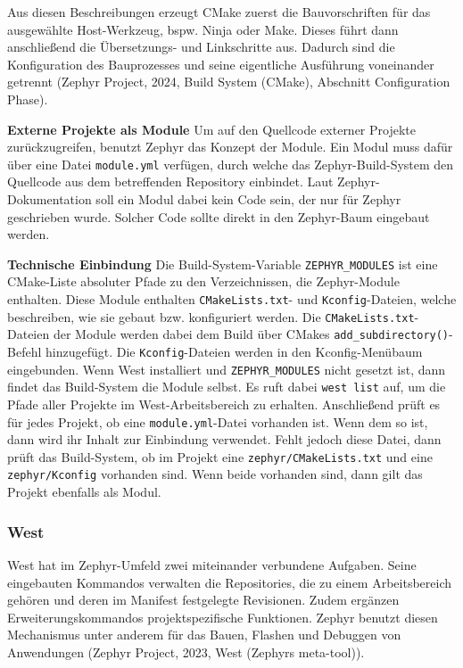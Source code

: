 Aus diesen Beschreibungen erzeugt CMake zuerst die Bauvorschriften f{\"u}r das ausgew{\"a}hlte Host-Werkzeug, bspw. Ninja oder Make. Dieses f{\"u}hrt dann anschlie{\ss}end die {\"U}bersetzungs- und Linkschritte aus. Dadurch sind die Konfiguration des Bauprozesses und seine eigentliche Ausf{\"u}hrung voneinander getrennt (Zephyr Project, 2024, \glqq{}Build System (CMake)\grqq{}, Abschnitt \glqq{}Configuration Phase\grqq{}).

\textbf{Externe Projekte als Module} Um auf den Quellcode externer Projekte zur{\"u}ckzugreifen, benutzt Zephyr das Konzept der \glqq{}Module\grqq{}. Ein Modul muss daf{\"u}r {\"u}ber eine Datei \lstinline[style=codeinline]|module.yml| verf{\"u}gen, durch welche das Zephyr-Build-System den Quellcode aus dem betreffenden Repository einbindet. Laut Zephyr-Dokumentation soll ein Modul dabei kein Code sein, der nur f{\"u}r Zephyr geschrieben wurde. Solcher Code sollte direkt in den Zephyr-Baum eingebaut werden.

\textbf{Technische Einbindung} Die Build-System-Variable \lstinline[style=codeinline]|ZEPHYR_MODULES| ist eine CMake-Liste absoluter Pfade zu den Verzeichnissen, die Zephyr-Module enthalten. Diese Module enthalten \lstinline[style=codeinline]|CMakeLists.txt|- und \lstinline[style=codeinline]|Kconfig|-Dateien, welche beschreiben, wie sie gebaut bzw. konfiguriert werden. Die \lstinline[style=codeinline]|CMakeLists.txt|-Dateien der Module werden dabei dem Build {\"u}ber CMakes \lstinline[style=codeinline]|add_subdirectory()|-Befehl hinzugef{\"u}gt. Die \lstinline[style=codeinline]|Kconfig|-Dateien werden in den Kconfig-Men{\"u}baum eingebunden. Wenn West installiert und \lstinline[style=codeinline]|ZEPHYR_MODULES| nicht gesetzt ist, dann findet das Build-System die Module selbst. Es ruft dabei \lstinline[style=codeinline]|west list| auf, um die Pfade aller Projekte im West-Arbeitsbereich zu erhalten. Anschlie{\ss}end pr{\"u}ft es f{\"u}r jedes Projekt, ob eine \lstinline[style=codeinline]|module.yml|-Datei vorhanden ist. Wenn dem so ist, dann wird ihr Inhalt zur Einbindung verwendet. Fehlt jedoch diese Datei, dann pr{\"u}ft das Build-System, ob im Projekt eine \lstinline[style=codeinline]|zephyr/CMakeLists.txt| und eine \lstinline[style=codeinline]|zephyr/Kconfig| vorhanden sind. Wenn beide vorhanden sind, dann gilt das Projekt ebenfalls als Modul.

\subsubsection{West}
West hat im Zephyr-Umfeld zwei miteinander verbundene Aufgaben. Seine eingebauten Kommandos verwalten die Repositories, die zu einem Arbeitsbereich geh{\"o}ren und deren im Manifest festgelegte Revisionen. Zudem erg{\"a}nzen Erweiterungskommandos projektspezifische Funktionen. Zephyr benutzt diesen Mechanismus unter anderem f{\"u}r das Bauen, Flashen und Debuggen von Anwendungen (Zephyr Project, 2023, \glqq{}West (Zephyr\grq{}s meta-tool)\grqq{}).

